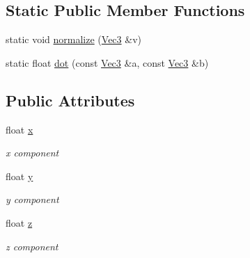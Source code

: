 \subsection*{Static Public Member Functions}
\begin{DoxyCompactItemize}
\item 
static void \hyperlink{class_vec3_a4cec0cb414193b5dc60e373e8b4f25c7}{normalize} (\hyperlink{class_vec3}{Vec3} \&v)
\item 
static float \hyperlink{class_vec3_a53e170680780a9654f23d71e94ad91a2}{dot} (const \hyperlink{class_vec3}{Vec3} \&a, const \hyperlink{class_vec3}{Vec3} \&b)
\end{DoxyCompactItemize}
\subsection*{Public Attributes}
\begin{DoxyCompactItemize}
\item 
float \hyperlink{class_vec3_a2814580e9b9372738c0a61197ea46b51}{x}
\begin{DoxyCompactList}\small\item\em x component \end{DoxyCompactList}\item 
float \hyperlink{class_vec3_abc1d241232cb04aa98217a942402ae68}{y}
\begin{DoxyCompactList}\small\item\em y component \end{DoxyCompactList}\item 
float \hyperlink{class_vec3_a64f3f00cd2dd9076999eeb2f05210388}{z}
\begin{DoxyCompactList}\small\item\em z component \end{DoxyCompactList}\end{DoxyCompactItemize}
